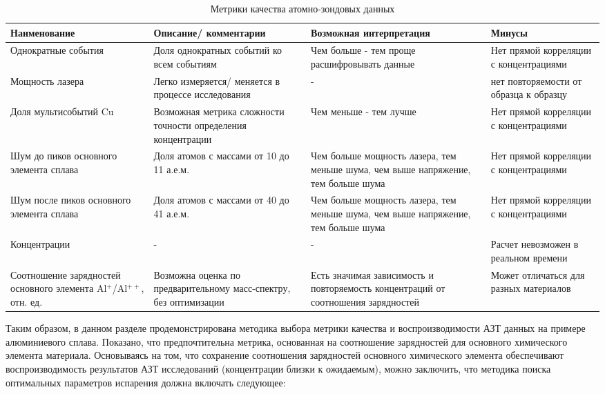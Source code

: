 \begin{table} [htb]
	\centering
	\caption{Метрики качества атомно-зондовых данных}
	\label{tab:params_expl}
	\begin{SingleSpace}
		\begin{tabularx}{\textwidth} {| X | X | X | X |}
			\hline
			Наименование & Описание/ комментарии & Возможная интерпретация & Минусы  \\ \hline
			Однократные события & {Доля однократных событий ко всем событиям}  & {Чем больше - тем проще расшифровывать данные}  & {Нет прямой корреляции с концентрациями}              \\ \hline
			Мощность лазера & {Легко измеряется/ меняется в процессе исследования}  & {-}  & {нет повторяемости от образца к образцу}              \\ \hline
			Доля мультисобытий Cu & Возможная метрика сложности точности определения концентрации & Чем меньше - тем лучше & Нет прямой корреляции с концентрациями          \\ \hline		
			Шум до пиков основного элемента сплава      & Доля атомов с массами от 10 до 11 а.е.м. & Чем больше мощность лазера, тем меньше шума, чем выше напряжение, тем больше шума  & Нет прямой корреляции с концентрациями               \\ \hline
			Шум после пиков основного элемента сплава     & Доля атомов с массами от 40 до 41 а.е.м. & Чем больше мощность лазера, тем меньше шума, чем выше напряжение, тем больше шума  & Нет прямой корреляции с концентрациями             \\ \hline
			Концентрации  & -   &  -   & Расчет невозможен в реальном времени  \\ \hline			
			Соотношение зарядностей основного элемента Al$^+$/Al$^{++}$, отн. ед.    & Возможна оценка по предварительному масс-спектру, без оптимизации   & Есть значимая зависимость и повторяемость концентраций от соотношения зарядностей  & Может отличаться для разных материалов   \\ \hline
		\end{tabularx}
	\end{SingleSpace}
\end{table}

\FloatBarrier
Таким образом, в данном разделе продемонстрирована методика выбора метрики качества и воспроизводимости АЗТ данных на примере алюминиевого сплава. Показано, что предпочтительна метрика, основанная на соотношение зарядностей для основного химического элемента материала. Основываясь на том, что сохранение соотношения зарядностей основного химического элемента обеспечивают воспроизводимость результатов АЗТ исследований (концентрации близки к ожидаемым), можно заключить, что методика поиска оптимальных параметров испарения должна включать следующее:

